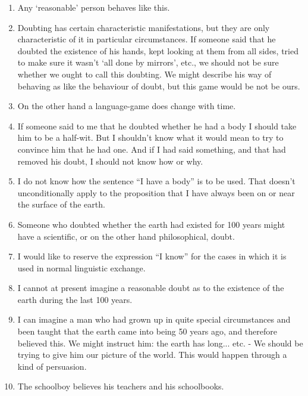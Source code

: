 \documentclass{book}
\begin{document}
\begin{enumerate}
\item
Any `reasonable' person behaves like this.

\item
Doubting has certain characteristic manifestations, but they are only
characteristic of it in particular circumstances. If someone said that he
doubted the existence of his hands, kept looking at them from all sides, tried
to make sure it wasn't `all done by mirrors', etc., we should not be sure
whether we ought to call this doubting. We might describe his way of behaving
as like the behaviour of doubt, but this game would be not be ours.

\item
On the other hand a language-game does change with time.

\item
If someone said to me that he doubted whether he had a body I should take him
to be a half-wit. But I shouldn't know what it would mean to try to convince
him that he had one. And if I had said something, and that had removed his
doubt, I should not know how or why.

\item
I do not know how the sentence ``I have a body'' is to be used.  That doesn't
unconditionally apply to the proposition that I have always been on or near the
surface of the earth.

\item
Someone who doubted whether the earth had existed for 100 years might have a
scientific, or on the other hand philosophical, doubt.

\item
I would like to reserve the expression ``I know'' for the cases in which it is
used in normal linguistic exchange.

\item
I cannot at present imagine a reasonable doubt as to the existence of the earth
during the last 100 years.

\item
I can imagine a man who had grown up in quite special circumstances and been
taught that the earth came into being 50 years ago, and therefore believed
this. We might instruct him: the earth has long... etc. - We should be trying
to give him our picture of the world.  This would happen through a kind of
persuasion.

\item
The schoolboy believes his teachers and his schoolbooks.


\end{enumerate}
\end{document}
